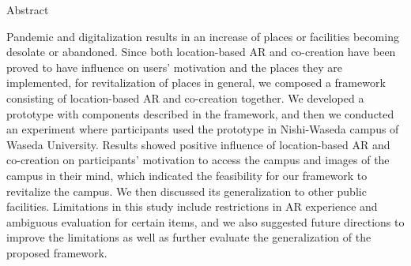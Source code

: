 \documentclass[a4paper, 12pt, oneside]{book}
\begin{document}
\pagebreak
\hspace{0pt}
\vfill %
    \begin{center}
    Abstract
    \end{center}
Pandemic and digitalization results in an increase of places or facilities becoming desolate or abandoned.
Since both location-based AR and co-creation have been proved to have influence on users' motivation and the places they are implemented,
for revitalization of places in general, we composed a framework consisting of location-based AR and co-creation together.
We developed a prototype with components described in the framework, and then we conducted an experiment where participants used the prototype in Nishi-Waseda campus of Waseda University.
Results showed positive influence of location-based AR and co-creation on participants' motivation to access the campus and images of the campus in their mind,
which indicated the feasibility for our framework to revitalize the campus. We then discussed its generalization to other public facilities.
Limitations in this study include restrictions in AR experience and ambiguous evaluation for certain items, and we also suggested future directions to improve the limitations as well as further evaluate the generalization of the proposed framework.
\vfill
\pagebreak




\tableofcontents
\listoffigures 
\listoftables

\clearpage
% 








\printbibliography

\appendix

\end{document}

